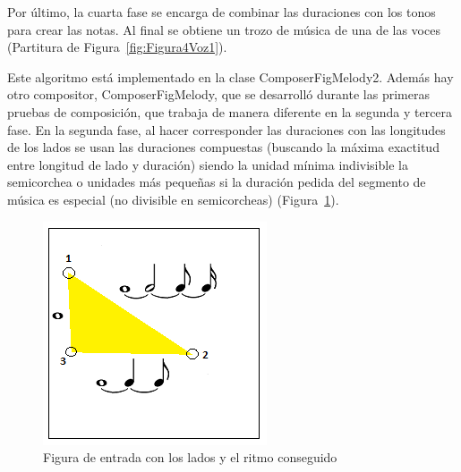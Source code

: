 Por último, la cuarta fase se encarga de combinar las duraciones con los tonos para crear las notas. Al final se obtiene un trozo de música de una de las voces (Partitura de Figura~\ref{fig:Figura4Voz1}).

Este algoritmo está implementado en la clase ComposerFigMelody2. Además hay otro compositor, ComposerFigMelody, que se desarrolló durante las primeras pruebas de composición, que trabaja de manera diferente en la segunda y tercera fase. En la segunda fase, al hacer corresponder las duraciones con las longitudes de los lados se usan las duraciones compuestas (buscando la máxima exactitud entre longitud de lado y duración) siendo la unidad mínima indivisible la semicorchea o unidades más pequeñas si la duración pedida del segmento de música es especial (no divisible en semicorcheas) (Figura~\ref{fig:Figura5Voz1}).

		\begin{figure}[htbp]
		\centering
		\hspace*{0.0in}
		\includegraphics[scale=1]{graphics/simpletest1-F2_2.png}
		\caption{Figura de entrada con los lados y el ritmo conseguido}
		\label{fig:Figura5Voz1}
		\end{figure}

